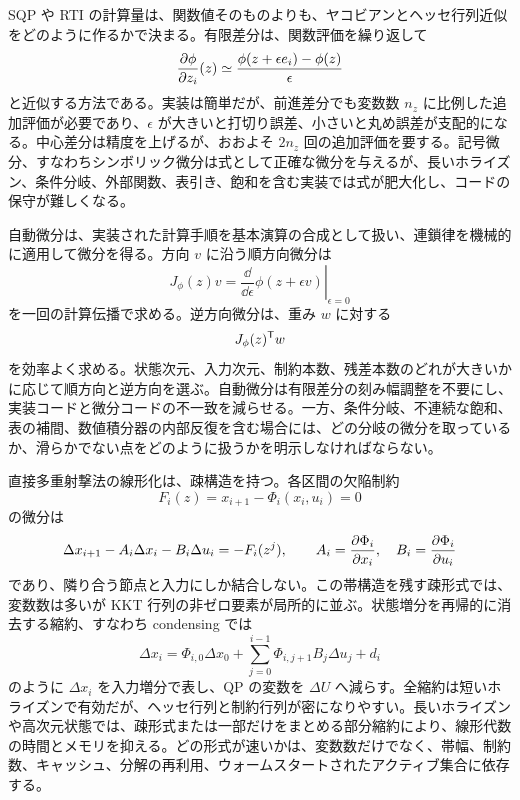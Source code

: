 SQP や RTI の計算量は、関数値そのものよりも、ヤコビアンとヘッセ行列近似をどのように作るかで決まる。有限差分は、関数評価を繰り返して
\begin{equation}
  \frac{\partial \phi}{\partial z_i}(z)
  \simeq
  \frac{\phi(z+\epsilon e_i)-\phi(z)}{\epsilon}
\end{equation}
と近似する方法である。実装は簡単だが、前進差分でも変数数 $n_z$ に比例した追加評価が必要であり、$\epsilon$ が大きいと打切り誤差、小さいと丸め誤差が支配的になる。中心差分は精度を上げるが、おおよそ $2n_z$ 回の追加評価を要する。記号微分、すなわちシンボリック微分は式として正確な微分を与えるが、長いホライズン、条件分岐、外部関数、表引き、飽和を含む実装では式が肥大化し、コードの保守が難しくなる。

自動微分は、実装された計算手順を基本演算の合成として扱い、連鎖律を機械的に適用して微分を得る。方向 $v$ に沿う順方向微分は
\begin{equation}
  J_\phi(z)v
  =
  \left.\frac{\dd}{\dd\epsilon}\phi(z+\epsilon v)\right|_{\epsilon=0}
\end{equation}
を一回の計算伝播で求める。逆方向微分は、重み $w$ に対する
\begin{equation}
  J_\phi(z)^{\mathsf{T}} w
\end{equation}
を効率よく求める。状態次元、入力次元、制約本数、残差本数のどれが大きいかに応じて順方向と逆方向を選ぶ。自動微分は有限差分の刻み幅調整を不要にし、実装コードと微分コードの不一致を減らせる。一方、条件分岐、不連続な飽和、表の補間、数値積分器の内部反復を含む場合には、どの分岐の微分を取っているか、滑らかでない点をどのように扱うかを明示しなければならない。

直接多重射撃法の線形化は、疎構造を持つ。各区間の欠陥制約
\begin{equation}
  F_i(z)=x_{i+1}-\Phi_i(x_i,u_i)=0
\end{equation}
の微分は
\begin{equation}
  \Delta x_{i+1}
  -A_i\Delta x_i
  -B_i\Delta u_i
  =-F_i(z^j),
  \qquad
  A_i=\frac{\partial\Phi_i}{\partial x_i},
  \quad
  B_i=\frac{\partial\Phi_i}{\partial u_i}
\end{equation}
であり、隣り合う節点と入力にしか結合しない。この帯構造を残す疎形式では、変数数は多いが KKT 行列の非ゼロ要素が局所的に並ぶ。状態増分を再帰的に消去する縮約、すなわち condensing では
\begin{equation}
  \Delta x_i
  =
  \Phi_{i,0}\Delta x_0
  +\sum_{j=0}^{i-1}\Phi_{i,j+1}B_j\Delta u_j
  +d_i
\end{equation}
のように $\Delta x_i$ を入力増分で表し、QP の変数を $\Delta U$ へ減らす。全縮約は短いホライズンで有効だが、ヘッセ行列と制約行列が密になりやすい。長いホライズンや高次元状態では、疎形式または一部だけをまとめる部分縮約により、線形代数の時間とメモリを抑える。どの形式が速いかは、変数数だけでなく、帯幅、制約数、キャッシュ、分解の再利用、ウォームスタートされたアクティブ集合に依存する。

